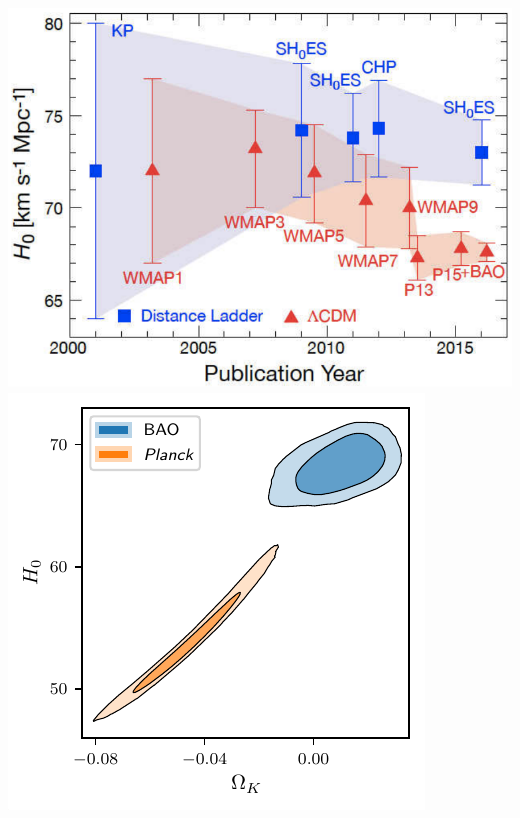 \documentclass[aspectratio=169]{beamer}
\begin{document}
\begin{frame}
\begin{columns}[T]
            \includegraphics[width=\columnwidth]{figures/H0.pdf}
            \includegraphics[width=\columnwidth]{figures/curvature_1.pdf}
    \end{columns}
\end{frame}
\end{document}
